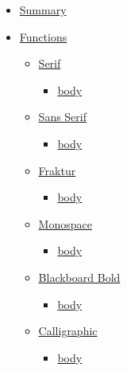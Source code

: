 \begin{itemize}
\tightlist
\item
  \hyperref[summary]{Summary}
\item
  \hyperref[functions]{Functions}

  \begin{itemize}
  \tightlist
  \item
    \hyperref[functions-serif]{Serif}

    \begin{itemize}
    \tightlist
    \item
      \hyperref[functions-serif-body]{body}
    \end{itemize}
  \item
    \hyperref[functions-sans]{Sans Serif}

    \begin{itemize}
    \tightlist
    \item
      \hyperref[functions-sans-body]{body}
    \end{itemize}
  \item
    \hyperref[functions-frak]{Fraktur}

    \begin{itemize}
    \tightlist
    \item
      \hyperref[functions-frak-body]{body}
    \end{itemize}
  \item
    \hyperref[functions-mono]{Monospace}

    \begin{itemize}
    \tightlist
    \item
      \hyperref[functions-mono-body]{body}
    \end{itemize}
  \item
    \hyperref[functions-bb]{Blackboard Bold}

    \begin{itemize}
    \tightlist
    \item
      \hyperref[functions-bb-body]{body}
    \end{itemize}
  \item
    \hyperref[functions-cal]{Calligraphic}

    \begin{itemize}
    \tightlist
    \item
      \hyperref[functions-cal-body]{body}
    \end{itemize}
  \end{itemize}
\end{itemize}

